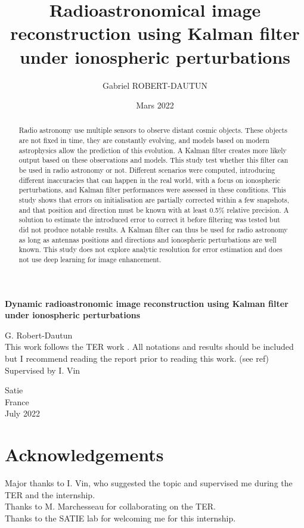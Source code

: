 \documentclass[titlepage,11pt]{article}
\author{Gabriel ROBERT-DAUTUN}
\date{Mars 2022}
\title{%
	Radioastronomical image reconstruction using Kalman filter under ionospheric perturbations}
\begin{document}
	
	\begin{titlepage}
	
	\vspace*{.3\textheight}
	\huge
	\centering
	\textbf{Dynamic radioastronomic image reconstruction using Kalman filter under ionospheric perturbations}
	
	\vspace{1cm}
	\LARGE
	G. Robert-Dautun\\
	\vspace*{22px}
	\normalsize
	This work follows the TER work \cite{TER}. All notations and results should be included but I recommend reading the report prior to reading this work. (see ref) \\	
	
	\vfill
	\large
	Supervised by I. Vin
	
	\vspace{0.8cm}
	
	\Large
	Satie\\
	France\\
	July 2022
	
	\end{titlepage}
	\section*{Acknowledgements}
	\vspace*{\fill}
	Major thanks to I. Vin, who suggested the topic and supervised me during the TER and the internship.\\
	
	Thanks to M. Marchesseau for collaborating on the TER. \\
	
	Thanks to the SATIE lab for welcoming me for this internship.
	\vspace*{\fill}
	
	\newpage
	\begin{abstract}
		Radio astronomy use multiple sensors to observe distant cosmic objects. These objects are not fixed in time, they are constantly evolving, and models based on modern astrophysics allow the prediction of this evolution. A Kalman filter creates more likely output based on these observations and models. This study test whether this filter can be used in radio astronomy or not. Different scenarios were computed, introducing different inaccuracies that can happen in the real world, with a focus on ionospheric perturbations, and Kalman filter performances were assessed in these conditions. This study shows that errors on initialisation are partially corrected within a few snapshots, and that position and direction must be known with at least 0.5\% relative precision. A solution to estimate the introduced error to correct it before filtering was tested but did not produce notable results. A Kalman filter can thus be used for radio astronomy as long as antennas positions and directions and ionospheric perturbations are well known. This study does not explore analytic resolution for error estimation and does not use deep learning for image enhancement.
	\end{abstract}
\end{document}
